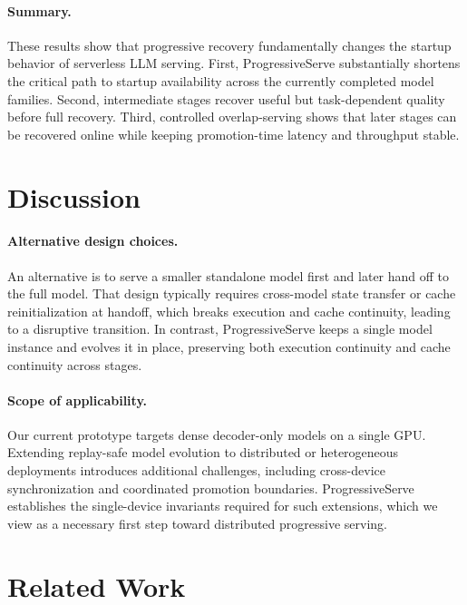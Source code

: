 \documentclass[sigplan,anonymous,review,nonacm]{acmart}
\begin{document}
\paragraph{Summary.}
These results show that progressive recovery fundamentally changes the startup behavior of serverless LLM serving.
First, ProgressiveServe substantially shortens the critical path to startup availability across the currently completed model families.
Second, intermediate stages recover useful but task-dependent quality before full recovery.
Third, controlled overlap-serving shows that later stages can be recovered online while keeping promotion-time latency and throughput stable.



\section{Discussion}

\paragraph{Alternative design choices.}
An alternative is to serve a smaller standalone model first and later hand off to the full model. That design typically requires cross-model state transfer or cache reinitialization at handoff, 
which breaks execution and cache continuity, leading to a disruptive transition. In contrast, ProgressiveServe keeps a single model instance and evolves it in place, preserving both execution continuity and cache continuity across stages.

\paragraph{Scope of applicability.}
Our current prototype targets dense decoder-only models on a single GPU. 
Extending replay-safe model evolution to distributed or heterogeneous deployments introduces additional challenges, 
including cross-device synchronization and coordinated promotion boundaries. 
ProgressiveServe establishes the single-device invariants required for such extensions, 
which we view as a necessary first step toward distributed progressive serving.

\section{Related Work}
\end{document}
